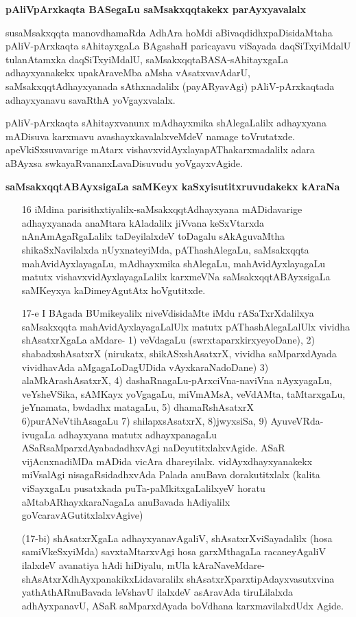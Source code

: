 \noindent
\textbf{pAliVpArxkaqta BASegaLu saMsakxqqtakekx parAyxyavalalx}\label{page44}


susaMsakxqqta manovdhamaRda AdhAra hoMdi aBivaqdidhxpaDisidaMtaha pAliV-pArxkaqta sAhitayxgaLa BAgashaH paricayavu viSayada daqSiTxyiMdalU tulanAtamxka daqSiTxyiMdalU, saMsakxqqtaBASA-sAhitayxgaLa adhayxyanakekx upakAraveMba aMsha vAsatxvavAdarU, saMsakxqqtAdhayxyanada sAthxnadalilx (payARyavAgi) pAliV-pArxkaqtada adhayxyanavu savaRthA yoVgayxvalalx.


pAliV-pArxkaqta sAhitayxvanunx mAdhayxmika shAlegaLalilx adhayxyana mADisuva karxmavu avashayxkavalalxveMdeV namage toVrutatxde. apeVkiSxsuvavarige mAtarx vishavxvidAyxlayapAThakarxmadalilx adara aBAyxsa swkayaRvananxLavaDisuvudu yoVgayxvAgide.

\noindent
\textbf{saMsakxqqtABAyxsigaLa saMKeyx kaSxyisutitxruvudakekx kAraNa}\label{page45}

\begin{itemize}
\item[16] iMdina parisithxtiyalilx-saMsakxqqtAdhayxyana mADidavarige adhayxyanada anaMtara kAladalilx jiVvana keSxVtarxda nAnAmAgaRgaLalilx taDeyilalxdeV toDagalu sAkAguvaMtha shikaSxNavilalxda nUyxnateyiMda, pAThashAlegaLu, saMsakxqqta mahAvidAyxlayagaLu, mAdhayxmika shAlegaLu, mahAvidAyxlayagaLu matutx vishavxvidAyxlayagaLalilx karxmeVNa saMsakxqqtABAyxsigaLa saMKeyxya kaDimeyAgutAtx hoVgutitxde.

\item[17-e] I BAgada BUmikeyalilx niveVdisidaMte iMdu rASaTxrXdalilxya saMsakxqqta mahAvidAyxlayagaLalUlx matutx pAThashAlegaLalUlx vividha shAsatxrXgaLa aMdare-
1) veVdagaLu (swrxtaparxkirxyeyoDane), 2) shabadxshAsatxrX (nirukatx, shikASxshAsatxrX, vividha saMparxdAyada vividhavAda aMgagaLoDagUDida vAyxkaraNadoDane) 3) alaMkArashAsatxrX, 4) dashaRnagaLu-pArxciVna-naviVna nAyxyagaLu, veYsheVSika, sAMKayx yoVgagaLu, miVmAMsA, veVdAMta, taMtarxgaLu, jeYnamata, bwdadhx matagaLu, 
5) dhamaRshAsatxrX 6)purANeVtihAsagaLu 7) shilapxsAsatxrX, 8)jwyxsiSa, 9) AyuveVRda-ivugaLa adhayxyana matutx adhayxpanagaLu ASaRsaMparxdAyabadadhxvAgi naDeyutitxlalxvAgide. ASaR vijAcnxnadiMDa mADida vicAra dhareyilalx. vidAyxdhayxyanakekx miVsalAgi nisagaRsidadhxvAda Palada anuBava dorakutitxlalx (kalita viSayxgaLu pusatxkada puTa-paMkitxgaLalilxyeV horatu aMtabARhayxkaraNagaLa anuBavada hAdiyalilx goVcaravAGutitxlalxvAgive)

(17-bi) shAsatxrXgaLa adhayxyanavAgaliV, shAsatxrXviSayadalilx (hosa samiVkeSxyiMda) savxtaMtarxvAgi hosa garxMthagaLa racaneyAgaliV ilalxdeV avanatiya hAdi hiDiyalu, mUla kAraNaveMdare-shAsAtxrXdhAyxpanakikxLidavaralilx shAsatxrXparxtipAdayxvasutxvina yathAthARnuBavada leVshavU ilalxdeV asAravAda tiruLilalxda adhAyxpanavU, ASaR saMparxdAyada boVdhana karxmavilalxdUdx Agide.
\end{itemize}

